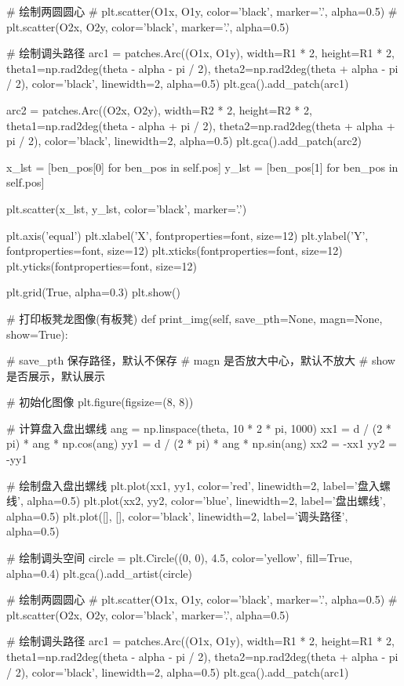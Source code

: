 \documentclass[withoutpreface,bwprint]{cumcmthesis}
\begin{document}
\begin{CodeText}
   # 绘制两圆圆心
   # plt.scatter(O1x, O1y, color='black', marker='.', alpha=0.5)
   # plt.scatter(O2x, O2y, color='black', marker='.', alpha=0.5)

   # 绘制调头路径
   arc1 = patches.Arc((O1x, O1y), width=R1 * 2, height=R1 * 2, theta1=np.rad2deg(theta -
             alpha - pi / 2), theta2=np.rad2deg(theta + alpha - pi / 2), color='black',
             linewidth=2, alpha=0.5)
   plt.gca().add_patch(arc1)

   arc2 = patches.Arc((O2x, O2y), width=R2 * 2, height=R2 * 2, theta1=np.rad2deg(theta -
             alpha + pi / 2), theta2=np.rad2deg(theta + alpha + pi / 2), color='black',
             linewidth=2, alpha=0.5)
   plt.gca().add_patch(arc2)

   x_lst = [ben_pos[0] for ben_pos in self.pos]
   y_lst = [ben_pos[1] for ben_pos in self.pos]

   plt.scatter(x_lst, y_lst, color='black', marker='.')


   plt.axis('equal')
   plt.xlabel('X', fontproperties=font, size=12)
   plt.ylabel('Y', fontproperties=font, size=12)
   plt.xticks(fontproperties=font, size=12)
   plt.yticks(fontproperties=font, size=12)

   plt.grid(True, alpha=0.3)
   plt.show()

# 打印板凳龙图像(有板凳)
def print_img(self, save_pth=None, magn=None, show=True):

   # save_pth 保存路径，默认不保存
   # magn 是否放大中心，默认不放大
   # show 是否展示，默认展示

   # 初始化图像
   plt.figure(figsize=(8, 8))

   # 计算盘入盘出螺线
   ang = np.linspace(theta, 10 * 2 * pi, 1000)
   xx1 = d / (2 * pi) * ang * np.cos(ang)
   yy1 = d / (2 * pi) * ang * np.sin(ang)
   xx2 = -xx1
   yy2 = -yy1

   # 绘制盘入盘出螺线
   plt.plot(xx1, yy1, color='red', linewidth=2, label='盘入螺线', alpha=0.5)
   plt.plot(xx2, yy2, color='blue', linewidth=2, label='盘出螺线', alpha=0.5)
   plt.plot([], [], color='black', linewidth=2, label='调头路径', alpha=0.5)

   # 绘制调头空间
   circle = plt.Circle((0, 0), 4.5, color='yellow', fill=True, alpha=0.4)
   plt.gca().add_artist(circle)

   # 绘制两圆圆心
   # plt.scatter(O1x, O1y, color='black', marker='.', alpha=0.5)
   # plt.scatter(O2x, O2y, color='black', marker='.', alpha=0.5)

   # 绘制调头路径
   arc1 = patches.Arc((O1x, O1y), width=R1 * 2, height=R1 * 2, theta1=np.rad2deg(theta -
             alpha - pi / 2), theta2=np.rad2deg(theta + alpha - pi / 2), color='black',
             linewidth=2, alpha=0.5)
   plt.gca().add_patch(arc1)


\end{CodeText}
\end{document}
